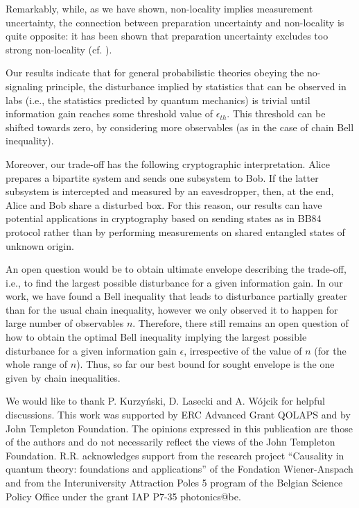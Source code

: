 \documentclass[pra,twocolumn,showpacs,preprintnumbers,amsmath,amssymb,superscriptaddress]{revtex4-1}
\begin{document}
Remarkably, while, as we have shown, non-locality implies measurement uncertainty, the connection between preparation uncertainty 
and non-locality is quite opposite: it has been shown \cite{OppenheimWehner2010} that  preparation uncertainty excludes too strong 
non-locality (cf. \cite{RaviPHorodecki2015}).

Our results indicate that for general probabilistic theories obeying the no-signaling principle, the disturbance 
implied by statistics that can be observed in labs (i.e., the statistics predicted by quantum mechanics)
is trivial until information gain reaches some threshold value of $\epsilon_{th}$. 
This threshold can be shifted towards zero, by considering more observables (as in the case of chain Bell inequality). 


Moreover, our trade-off has the following cryptographic interpretation. Alice prepares a bipartite system
and sends one subsystem to Bob. If the latter subsystem is intercepted and measured by an eavesdropper,
then, at the end, Alice and Bob share a disturbed box. For this reason, our results can have potential applications in cryptography based on sending states as in BB84 protocol rather than by performing measurements on shared entangled states of unknown origin.

An open question would be to obtain ultimate envelope describing the trade-off, i.e., to find the largest possible disturbance for a given information gain. In our work, we have found a Bell inequality that leads to disturbance partially greater than for the usual chain inequality, however we only observed it to happen for large number of observables $n$. Therefore, there still remains an open question of how to obtain the optimal Bell inequality implying the largest possible disturbance for a given information gain $\epsilon$, irrespective of the value of $n$ (for the whole range of $n$). Thus, so far our best bound for sought envelope is the one given by chain inequalities. 


\begin{acknowledgments}
We would like to thank P. Kurzy{\'n}ski, D. Lasecki and A. W{\'o}jcik for helpful discussions. This work was supported by ERC Advanced Grant QOLAPS and by John Templeton Foundation. The opinions expressed in this publication are those of the authors and do not necessarily reflect the views of the John Templeton Foundation. R.R. acknowledges support from the research project  ``Causality in quantum theory: foundations and applications'' of the Fondation Wiener-Anspach and from the Interuniversity Attraction Poles 5 program of the Belgian Science Policy Office under the grant IAP P7-35 photonics@be.
\end{acknowledgments}
\end{document}
